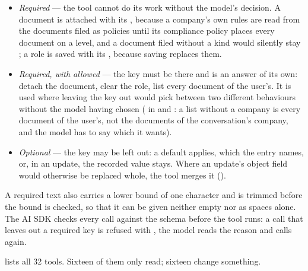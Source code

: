 \begin{itemize}
  \item \emph{Required} --- the tool cannot do its work without the model's decision. A
    document is attached with its , because a company's own rules are read from
    the documents filed as policies until its compliance policy places every document on a
    level, and a document filed without a kind would silently stay ; a role is
    saved with its , because saving replaces them.
  \item \emph{Required, with  allowed} --- the key must be there and  is
    an answer of its own: detach the document, clear the role, list every document of the
    user's. It is used where leaving the key out would pick between two different behaviours
    without the model having chosen ( in  and
    : a list without a company is every document of the
    user's, not the documents of the conversation's company, and the model has to say which
    it wants).
  \item \emph{Optional} --- the key may be left out: a default applies, which the entry
    names, or, in an update, the recorded value stays. Where an update's object field would
    otherwise be replaced whole, the tool merges it ().
\end{itemize}

A required text also carries a lower bound of one character and is trimmed before the bound
is checked, so that it can be given neither empty nor as spaces alone. The AI SDK checks every
call against the schema before the tool runs: a call that
leaves out a required key is refused with , the model reads the
reason and calls again.

 lists all 32 tools. Sixteen of them only read; sixteen change
something.

